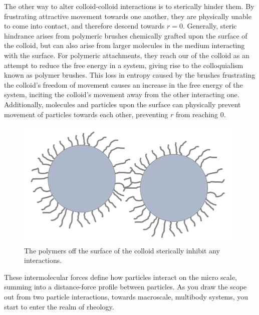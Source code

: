 
The other way to alter colloid-colloid interactions is to sterically hinder them. By frustrating attractive movement towards one another, they are physically unable to come into contact, and therefore descend towards $r = 0$. Generally, steric hindrance arises from polymeric brushes chemically grafted upon the surface of the colloid, but can also arise from larger molecules in the medium interacting with the surface. For polymeric attachments, they reach our of the colloid as an attempt to reduce the free energy in a system, giving rise to the colloquialism known as polymer brushes. This loss in entropy caused by the brushes frustrating the colloid's freedom of movement causes an increase in the free energy of the system, inciting the colloid's movement away from the other interacting one. Additionally, molecules and particles upon the surface can physically prevent movement of particles towards each other, preventing $r$ from reaching 0.\cite{?}

\begin{figure}[h]     %
        \begin{center}
          \includegraphics[width=110mm]{chapter1/brushy.PNG}
\end{center}
\caption{The polymers off the surface of the colloid sterically inhibit any interactions.}
\label{fig:brushy}                 %
\end{figure}

These intermolecular forces define how particles interact on the micro scale, summing into a distance-force profile between particles. As you draw the scope out from two particle interactions, towards macroscale, multibody systems, you start to enter the realm of rheology.

